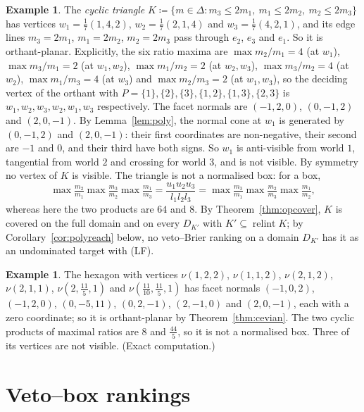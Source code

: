 \documentclass[11pt]{article}
\DeclareMathOperator{\relint}{relint}
\theoremstyle{plain}
\theoremstyle{definition}
\newtheorem{example}[theorem]{Example}
\theoremstyle{remark}
\begin{document}
\begin{example}\label{ex:cyclic}
The \emph{cyclic triangle} $K\coloneqq\{m\in\Delta:m_3\le2m_1,\ m_1\le2m_2,\ m_2\le2m_3\}$
has vertices $w_1=\frac17(1,4,2)$, $w_2=\frac17(2,1,4)$ and $w_3=\frac17(4,2,1)$, and its
edge lines $m_3=2m_1$, $m_1=2m_2$, $m_2=2m_3$ pass through $e_2$, $e_3$ and $e_1$. So it is
orthant-planar. Explicitly, the six ratio maxima are $\max m_2/m_1=4$ (at $w_1$), $\max
m_3/m_1=2$ (at $w_1,w_2$), $\max m_1/m_2=2$ (at $w_2,w_3$), $\max m_3/m_2=4$ (at $w_2$),
$\max m_1/m_3=4$ (at $w_3$) and $\max m_2/m_3=2$ (at $w_1,w_3$), so the deciding vertex of
the orthant with $P=\{1\},\{2\},\{3\},\{1,2\},\{1,3\},\{2,3\}$ is $w_1,w_2,w_3,w_2,w_1,w_3$
respectively. The facet normals are $(-1,2,0)$, $(0,-1,2)$ and $(2,0,-1)$. By
Lemma~\ref{lem:poly}, the normal cone at $w_1$ is generated by $(0,-1,2)$ and $(2,0,-1)$:
their first coordinates are non-negative, their second are $-1$ and $0$, and their third
have both signs. So $w_1$ is anti-visible from world $1$, tangential from world $2$ and
crossing for world $3$, and is not visible. By symmetry no vertex of $K$ is
visible. The triangle is not a normalised box: for a box,
\[
  \max\tfrac{m_2}{m_1}\max\tfrac{m_3}{m_2}\max\tfrac{m_1}{m_3}
  =\frac{u_1u_2u_3}{l_1l_2l_3}=\max\tfrac{m_3}{m_1}\max\tfrac{m_2}{m_3}\max\tfrac{m_1}{m_2},
\]
whereas here the two products are $64$ and $8$. By Theorem~\ref{thm:opcover}, $K$ is
covered on the full domain and on every $D_{K'}$ with $K'\subseteq\relint K$; by
Corollary~\ref{cor:polyreach} below, no veto--Brier ranking on a domain $D_{K'}$ has it as
an undominated target with (LF).
\end{example}

\begin{example}\label{ex:hexagon}
The hexagon with vertices $\nu(1,2,2)$, $\nu(1,1,2)$, $\nu(2,1,2)$, $\nu(2,1,1)$,
$\nu(2,\frac{11}5,1)$ and $\nu(\frac{11}{10},\frac{11}5,1)$ has facet normals $(-1,0,2)$,
$(-1,2,0)$, $(0,-5,11)$, $(0,2,-1)$, $(2,-1,0)$ and $(2,0,-1)$, each with a zero
coordinate; so it is orthant-planar by Theorem~\ref{thm:cevian}. The two cyclic products of
maximal ratios are $8$ and $\frac{44}5$, so it is not a normalised box. Three of its
vertices are not visible. (Exact computation.)
\end{example}

\section{Veto--box rankings}\label{sec:vbox}
\end{document}
